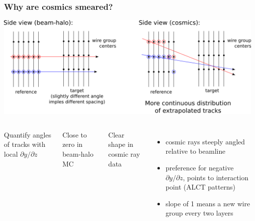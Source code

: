 \documentclass[compress]{beamer}
\begin{document}
\begin{frame}
\frametitle{Why are cosmics smeared?}

\vfill
\includegraphics[width=\linewidth]{why_cosmics_smeared.png}

\begin{columns}
\scriptsize

Quantify angles of tracks with local $\partial y/\partial z$

\vspace{0.1 cm}
Close to zero in beam-halo MC

\vspace{0.1 cm} Clear shape in cosmic ray data
\begin{itemize}
\item cosmic rays steeply angled relative to beamline

\item preference for negative $\partial y/\partial z$, points to interaction point (ALCT patterns)

\item slope of 1 means a new wire group every two layers

\end{itemize}


\end{columns}
\end{frame}
\end{document}

